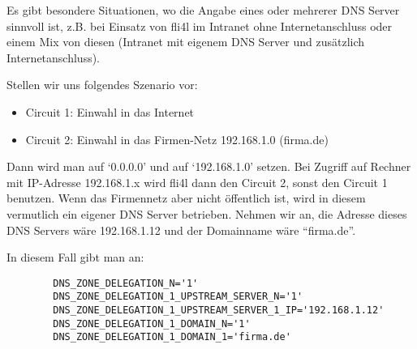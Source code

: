   \begin{description}


    { Es gibt besondere Situationen, wo die Angabe eines oder mehrerer
      DNS Server sinnvoll ist, z.B. bei Einsatz von fli4l im Intranet
      ohne Internetanschluss oder einem Mix von diesen (Intranet mit
      eigenem DNS Server und zusätzlich Internetanschluss).

      Stellen wir uns folgendes Szenario vor:

      \begin{itemize}
      \item Circuit 1: Einwahl in das Internet
      \item Circuit 2: Einwahl in das Firmen-Netz 192.168.1.0 (firma.de)
      \end{itemize}


      Dann wird man  auf `0.0.0.0'
      und  auf `192.168.1.0'
      setzen. Bei Zugriff auf Rechner mit IP-Adresse 192.168.1.x wird
      fli4l dann den Circuit 2, sonst den Circuit 1 benutzen.  Wenn
      das Firmennetz aber nicht öffentlich ist, wird in diesem
      vermutlich ein eigener DNS Server betrieben. Nehmen wir an, die
      Adresse dieses DNS Servers wäre 192.168.1.12 und der Domainname
      wäre ``firma.de''.

      In diesem Fall gibt man an:

\begin{example}
\begin{verbatim}
        DNS_ZONE_DELEGATION_N='1'
        DNS_ZONE_DELEGATION_1_UPSTREAM_SERVER_N='1'
        DNS_ZONE_DELEGATION_1_UPSTREAM_SERVER_1_IP='192.168.1.12'
        DNS_ZONE_DELEGATION_1_DOMAIN_N='1'
        DNS_ZONE_DELEGATION_1_DOMAIN_1='firma.de'
\end{verbatim}
\end{example}

}
\end{description}
